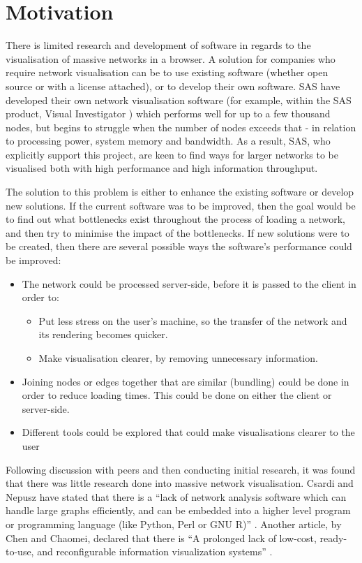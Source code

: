\documentclass[../dissertation.tex]{subfiles}
\begin{document}
\chapter{Motivation}

There is limited research and development of software in regards to the visualisation of massive networks in a browser. A solution for companies who require network visualisation can be to use existing software (whether open source or with a license attached), or to develop their own software. SAS \cite{sas} have developed their own network visualisation software (for example, within the SAS product, Visual Investigator \cite{sasvi}) which performs well for up to a few thousand nodes, but begins to struggle when the number of nodes exceeds that - in relation to processing power, system memory and bandwidth. As a result, SAS, who explicitly support this project, are keen to find ways for larger networks to be visualised both with high performance and high information throughput.

The solution to this problem is either to enhance the existing software or develop new solutions. If the current software was to be improved, then the goal would be to find out what bottlenecks exist throughout the process of loading a network, and then try to minimise the impact of the bottlenecks. If new solutions were to be created, then there are several possible ways the software's performance could be improved:

\begin{itemize}
	\item The network could be processed server-side, before it is passed to the client in order to:
	\begin{itemize}
	    \item Put less stress on the user's machine, so the transfer of the network and its rendering becomes quicker.
	    \item Make visualisation clearer, by removing unnecessary information.
	\end{itemize}
	\item Joining nodes or edges together that are similar (bundling) could be done in order to reduce loading times. This could be done on either the client or server-side.
	\item Different tools could be explored that could make visualisations clearer to the user
\end{itemize}

Following discussion with peers and then conducting initial research, it was found that there was little research done into massive network visualisation. Csardi and Nepusz have stated that there is a ``lack of network analysis software which can handle large graphs efficiently, and can be embedded into a higher level program or programming language (like Python, Perl or GNU R)'' \cite{csardi2006igraph}. Another article, by Chen and Chaomei, declared that there is ``A prolonged lack of low-cost, ready-to-use, and reconfigurable information visualization systems'' \cite{chen2005top}. 
\end{document}

